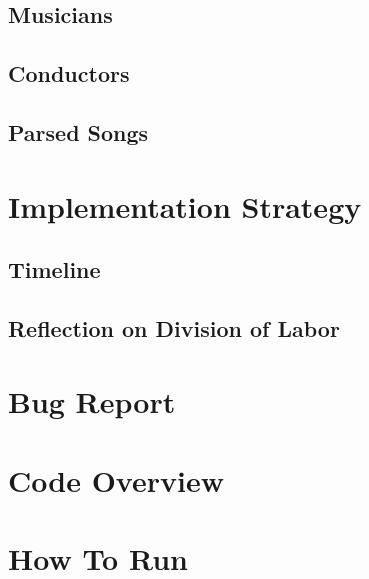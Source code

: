 \documentclass[10pt,letterpaper]{article}
\begin{document}
        \subsection{Musicians}
        
        \subsection{Conductors}

        \subsection{Parsed Songs}


    \section{Implementation Strategy}

        \subsection{Timeline}

        \subsection{Reflection on Division of Labor}


    \section{Bug Report}


    \section{Code Overview}


    \section{How To Run}
\end{document}
